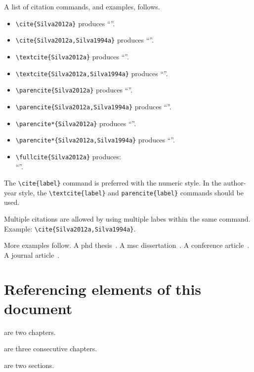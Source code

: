 A list of citation commands, and examples, follows.

\begin{itemize}
\item
\verb+\cite{Silva2012a}+ produces ``\cite{Silva2012a}''.
\item
\verb+\cite{Silva2012a,Silva1994a}+ produces ``\cite{Silva2012a,Silva1994a}''.
\item
\verb+\textcite{Silva2012a}+ produces ``\textcite{Silva2012a}''.
\item
\verb+\textcite{Silva2012a,Silva1994a}+ produces ``\textcite{Silva2012a,Silva1994a}''.
\item
\verb+\parencite{Silva2012a}+ produces ``\parencite{Silva2012a}''.
\item
\verb+\parencite{Silva2012a,Silva1994a}+ produces ``\parencite{Silva2012a,Silva1994a}''.
\item
\verb+\parencite*{Silva2012a}+ produces ``\parencite*{Silva2012a}''.
\item
\verb+\parencite*{Silva2012a,Silva1994a}+ produces ``\parencite*{Silva2012a,Silva1994a}''.
\item
\verb+\fullcite{Silva2012a}+ produces:\\``''.
\end{itemize}

The \verb+\cite{label}+ command is preferred with the numeric style. In the author-year style, the \verb+\textcite{label}+ and \verb+parencite{label}+ commands should be used.

Multiple citations are allowed by using multiple labes within the same command. Example: \verb+\cite{Silva2012a,Silva1994a}+.

More examples follow. A \acrshort{phd} thesis~\parencite{Silva1994a}. A \acrshort{msc} dissertation~\parencite{Antunes2015a}. A conference article~\parencite{Antunes2020a}. A journal article~\parencite{Antunes2019a}.

\section{Referencing elements of this document}
\label{sec:referencing-elements-of-this-document}

 are two chapters.

 are three consecutive chapters.

 are two sections.


